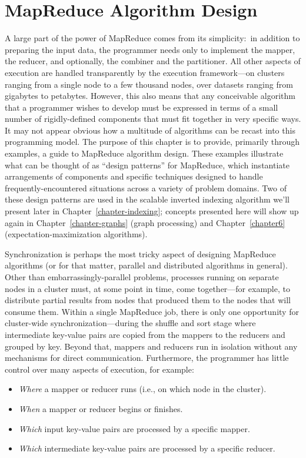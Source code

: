 \chapter{MapReduce Algorithm Design}
\label{chapter3}

A large part of the power of MapReduce comes from its simplicity:\ in
addition to preparing the input data, the programmer needs only to
implement the mapper, the reducer, and optionally, the combiner and
the partitioner.  All other aspects of execution are handled
transparently by the execution framework---on clusters ranging from a
single node to a few thousand nodes, over datasets ranging from
gigabytes to petabytes.  However, this also means that any conceivable
algorithm that a programmer wishes to develop must be expressed in
terms of a small number of rigidly-defined components that must fit
together in very specific ways.  It may not appear obvious how a
multitude of algorithms can be recast into this programming model.
The purpose of this chapter is to provide, primarily through examples,
a guide to MapReduce algorithm design.  These examples illustrate what
can be thought of as ``design patterns'' for MapReduce, which
instantiate arrangements of components and specific techniques
designed to handle frequently-encountered situations across a variety
of problem domains.  Two of these design patterns are used in the
scalable inverted indexing algorithm we'll present later in
Chapter~\ref{chapter-indexing}; concepts presented here will show up
again in Chapter~\ref{chapter-graphs} (graph processing) and
Chapter~\ref{chapter6} (expectation-maximization algorithms).

Synchronization is perhaps the most tricky aspect of designing
MapReduce algorithms (or for that matter, parallel and distributed
algorithms in general).  Other than embarrassingly-parallel problems,
processes running on separate nodes in a cluster must, at some point
in time, come together---for example, to distribute partial results
from nodes that produced them to the nodes that will consume them.
Within a single MapReduce job, there is only one opportunity for
cluster-wide synchronization---during the shuffle and sort stage where
intermediate key-value pairs are copied from the mappers to the
reducers and grouped by key.  Beyond that, mappers and reducers run in
isolation without any mechanisms for direct communication.
Furthermore, the programmer has little control over many aspects of
execution, for example:

\begin{itemize}

\item {\it Where} a mapper or reducer runs (i.e., on which node in the
  cluster).

\item {\it When} a mapper or reducer begins or finishes.

\item {\it Which} input key-value pairs are processed by a specific
  mapper.

\item {\it Which} intermediate key-value pairs are processed by a
  specific reducer.

\end{itemize}

